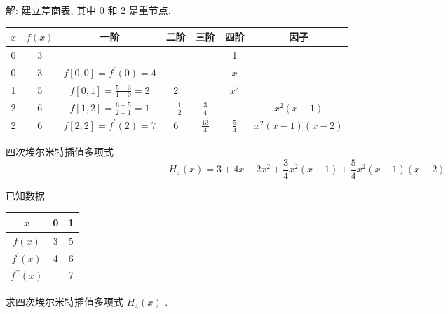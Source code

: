 解: 建立差商表, 其中 0 和 2 是重节点.
\begin{center}
\begin{tabular}{|c|c|c|c|c|c|c|}
\hline
$ x $ & $ f(x) $ & 一阶 & 二阶 & 三阶 & 四阶 & 因子 \\
\hline 0 & 3 & & & & 1 &\\
0 & 3 & $ f[0,0]=f^{\prime}(0)=4 $ & & & $ x $ &\\
1 & 5 & $ f[0,1]=\frac{5-3}{1-0}=2 $ & 2 & & $ x^{2} $ &\\
2 & 6 & $ f[1,2]=\frac{6-5}{2-1}=1 $ & $ -\frac{1}{2} $ & $ \frac{3}{4} $ & & $ x^{2}(x-1) $ \\
2 & 6 & $ f[2,2]=f^{\prime}(2)=7 $ & 6 & $ \frac{13}{4} $ & $ \frac{5}{4} $ & $ x^{2}(x-1)(x-2) $\\
\hline
\end{tabular}
\end{center}
四次埃尔米特插值多项式
$$
H_{4}(x)=3+4 x+2 x^{2}+\frac{3}{4} x^{2}(x-1)+\frac{5}{4} x^{2}(x-1)(x-2)
$$

已知数据
\begin{tabular}{c|cc}
$ x $ & 0 & 1 \\
\hline$ f(x) $ & 3 & 5 \\
$ f^{\prime}(x) $ & 4 & 6 \\
$ f^{\prime \prime}(x) $ & & 7
\end{tabular}
求四次埃尔米特插值多项式 $ H_{4}(x) $ .

